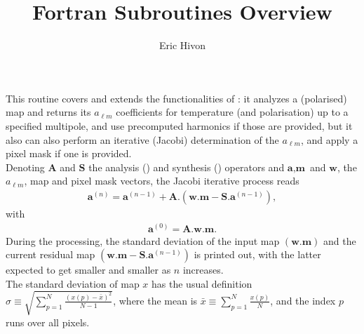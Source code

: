 
\sloppy


\title{\healpix Fortran Subroutines Overview}
 \section[map2alm\_iterative*]{ }
\label{sub:map2alm_iterative}
\author{Eric Hivon}

\begin{facility}
{This routine covers and extends the functionalities of : it
analyzes a (polarised)  map and returns
its $a_{\ell m}$ coefficients for temperature (and polarisation) up to a specified
multipole, and use precomputed harmonics if those
are provided, but it also can also perform an iterative (Jacobi) determination of the $a_{\ell m}$, and
apply a pixel mask if one is provided.\\
\newcommand{\bA}{\textbf{A}}
\newcommand{\bS}{\textbf{S}}
\newcommand{\ba}{\textbf{a}}
\newcommand{\bm}{\textbf{m}}
\newcommand{\bw}{\textbf{w}}
Denoting $\bA$ and $\bS$ the 
analysis  () and
synthesis ()
operators and  $\ba, \bm$ and $\bw$, the $a_{\ell m}$, map and pixel mask vectors, the
Jacobi iterative process reads 
\begin{eqnarray}
	\label{eq:map2alm_it_a}
	\ba^{(n)} = \ba^{(n-1)} + \bA. \left( \bw.\bm - \bS .\ba^{(n-1)} \right),
\end{eqnarray}
with
\begin{eqnarray}
	\label{eq:map2alm_it_b}
	\ba^{(0)} = \bA.\bw.\bm.
\end{eqnarray}
%
During the processing, the standard deviation of the input map $\left(\bw.\bm\right)$ 
and the current residual map $\left(\bw.\bm - \bS .\ba^{(n-1)}\right)$ is printed out, with the latter expected
to get smaller and smaller as $n$ increases.\\
The standard deviation of map $x$ has the usual definition
$\sigma \equiv \sqrt{\sum_{p=1}^{N}\frac{(x(p)-\bar{x})^2}{N-1}}$, where the mean is
$\bar{x} \equiv  \sum_{p=1}^{N} \frac{x(p)}{N}$, and the index $p$ runs over all pixels.%
}
\end{facility}
